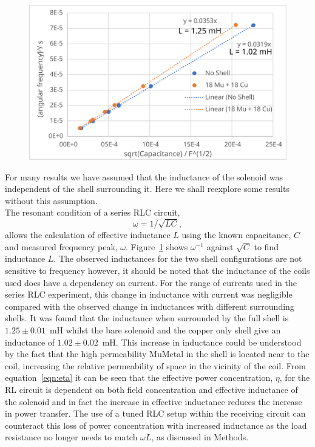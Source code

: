 \documentclass[11pt]{iopart}
\begin{document}
\begin{figure}
  \begin{center}
   \noindent\includegraphics[width=0.75\linewidth]{images/inductance.pdf}
  \end{center}
  \caption{}\label{fig:inductance}
\end{figure}
For many results we have assumed that the inductance of the solenoid
was independent of the shell surrounding it. Here we shall reexplore
some results without this assumption. \\ The resonant condition of a
series RLC circuit,
\begin{equation}
  \label{eqn:RLC}
  \omega = 1/\sqrt{LC},
\end{equation}
allows the calculation of effective inductance $L$ using the known
capacitance, $C$ and measured frequency peak,
$\omega$. Figure~\ref{fig:inductance} shows $\omega^{-1}$ against
$\sqrt{C}$ to find inductance $L$. The observed inductances for the
two shell configurations are not sensitive to frequency however, it
should be noted that the inductance of the coils used does have a
dependency on current. For the range of currents used in the series
RLC experiment, this change in inductance with current was negligible
compared with the observed change in inductances with different
surrounding shells. It was found that the inductance when surrounded
by the full shell is $1.25\pm0.01$~mH whilst the bare solenoid and the
copper only shell give an inductance of $1.02\pm0.02$~mH. This
increase in inductance could be understood by the fact that the high
permeability MuMetal in the shell is located near to the coil,
increasing the relative permeability of space in the vicinity of the
coil. From equation~\ref{eqn:eta} it can be seen that the effective
power concentration, $\eta$, for the RL circuit is dependent on both
field concentration and effective inductance of the solenoid and in
fact the increase in effective inductance reduces the increase in
power transfer. The use of a tuned RLC setup within the receiving
circuit can counteract this loss of power concentration with increased
inductance as the load resistance no longer needs to match $\omega L$,
as discussed in Methods.\\
\end{document}
